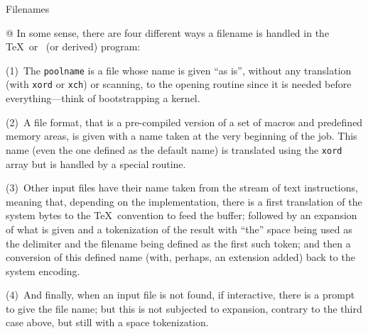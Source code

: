 
\begindiv Filenames

@ In some sense, there are four different ways a filename is handled
in the \TeX\ or \MF\ (or derived) program:

(1)~The {\tt poolname} is a file whose name is given ``as is'',
without any translation (with {\tt xord} or {\tt xch}) or scanning,
to the opening routine since it is needed before everything---think
of bootstrapping a kernel.

(2)~A file format, that is a pre-compiled version of a set of macros and
predefined memory areas, is given with a name taken at the very
beginning of the job. This name (even the one defined as the default
name) is translated using the {\tt xord} array but is handled by
a special routine.
 
(3)~Other input files have their name taken from the stream of
text instructions, meaning that, depending on the implementation,
there is a first translation of the system bytes to the \TeX\ convention
to feed the buffer; followed by an expansion of what is given and
a tokenization of the result with ``the'' space being used as the
delimiter and the filename being defined as the first such token;
and then a conversion of this defined name (with, perhaps, an extension
added) back to the system encoding.

(4)~And finally, when an input file is not found, if interactive,
there is a prompt to give the file name; but this is not subjected
to expansion, contrary to the third case above, but still with a
space tokenization.

